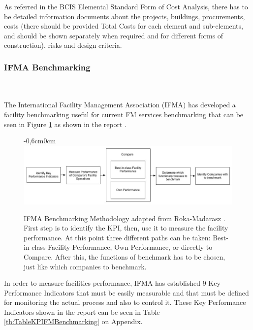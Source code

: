 As referred in the BCIS Elemental Standard Form of Cost Analysis, there has to be detailed information documents about the projects, buildings, procurements, costs (there should be provided Total Costs for each element and sub-elements, and should be shown separately when required and for different forms of construction), risks and design criteria.
\subsubsection{IFMA Benchmarking}
\hfill \\ \\ The International Facility Management Association (IFMA) has developed a facility benchmarking useful for current FM services benchmarking that can be seen in Figure \ref{fig:IFMAMethodology} as shown in the report \cite{Roka-Madarasz2010}.


\begin{figure}[t!]

  \centering
  \begin{adjustwidth}{-0,6cm}{0cm}
  \includegraphics[width=1.1\textwidth]{img/IFMAMethBenchProcess.jpg}
  \end{adjustwidth}
  \caption{IFMA Benchmarking Methodology adapted from Roka-Madarasz \cite{Roka-Madarasz2010}. First step is to identify the KPI, then, use it to measure the facility performance. At this point three different paths can be taken: Best-in-class Facility Performance, Own Performance, or directly to Compare. After this, the functions of benchmark has to be chosen, just like which companies to benchmark.}
  \label{fig:IFMAMethodology}
\end{figure}

In order to measure facilities performance, IFMA has established 9 Key Performance Indicators that must be easily measurable and that must be defined for monitoring the actual process and also to control it. These Key Performance Indicators shown in the report \cite{Roka-Madarasz2010} can be seen in Table \ref{tb:TableKPIFMBenchmarking} on Appendix.


